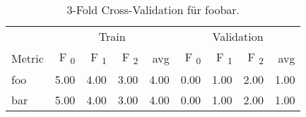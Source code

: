 \begin{table}[ht]
  \centering
  \caption{ 3-Fold Cross-Validation für foobar.}
  \begin{tabular}{lrrrrrrrr}
    \toprule
    & \multicolumn{ 4 }{c}{Train}
    & \multicolumn{ 4 }{c}{Validation}
    \\
    \cmidrule(l){ 2-5}
    \cmidrule(lr){ 6-9}
    Metric
     & F\textsubscript{ 0 } & F\textsubscript{ 1 } & F\textsubscript{ 2 } & avg %
     & F\textsubscript{ 0 } & F\textsubscript{ 1 } & F\textsubscript{ 2 } & avg %
    \\
    \midrule
      foo
      & 5.00& 4.00& 3.00
      & 4.00
      & 0.00& 1.00& 2.00
      & 1.00
      \\
      bar
      & 5.00& 4.00& 3.00
      & 4.00
      & 0.00& 1.00& 2.00
      & 1.00
      \\
    \bottomrule
  \end{tabular}
\end{table}
